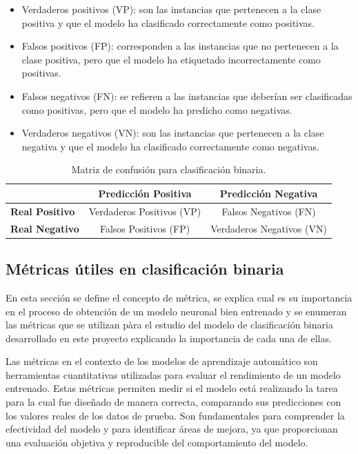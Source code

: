 \begin{itemize}

	\item Verdaderos positivos (VP): son las instancias que pertenecen a la clase positiva y que el modelo ha clasificado correctamente como positivas.

    \item Falsos positivos (FP): corresponden a las instancias que no pertenecen a la clase positiva, pero que el modelo ha etiquetado incorrectamente como positivas.

    \item Falsos negativos (FN): se refieren a las instancias que deberían ser clasificadas como positivas, pero que el modelo ha predicho como negativas.

    \item Verdaderos negativos (VN): son las instancias que pertenecen a la clase negativa y que el modelo ha clasificado correctamente como negativas.

\end{itemize}



\begin{table}[h]
\centering
\label{tab:confusion_matrix}
\begin{tabular}{|l|c|c|}
\hline
 & \textbf{Predicción Positiva} & \textbf{Predicción Negativa} \\ \hline
\textbf{Real Positivo} & Verdaderos Positivos (VP) & Falsos Negativos (FN) \\ \hline
\textbf{Real Negativo} & Falsos Positivos (FP) & Verdaderos Negativos (VN) \\ \hline
\end{tabular}
\caption{Matriz de confusión para clasificación binaria.}
\end{table}

\subsection{Métricas útiles en clasificación binaria}  \label{sec.metricas-bin}
En esta sección se define el concepto de métrica, se explica cual es su importancia en el proceso de obtención de un modelo neuronal bien entrenado y se enumeran las métricas que se utilizan pàra el estudio del modelo de clasificación binaria desarrollado en este proyecto explicando la importancia de cada una de ellas.

Las métricas en el contexto de los modelos de aprendizaje automático son herramientas cuantitativas utilizadas para evaluar el rendimiento de un modelo entrenado. Estas métricas permiten medir si el modelo está realizando la tarea para la cual fue diseñado de manera correcta, comparando sus predicciones con los valores reales de los datos de prueba. Son fundamentales para comprender la efectividad del modelo y para identificar áreas de mejora, ya que proporcionan una evaluación objetiva y reproducible del comportamiento del modelo.

